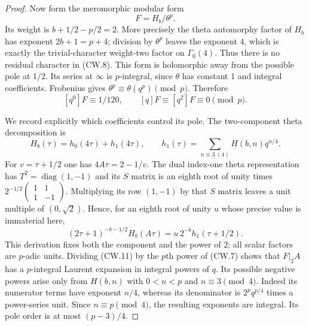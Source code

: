\documentclass[11pt,a4paper]{article}
\theoremstyle{definition}
\begin{document}
\begin{proof}
Now form the meromorphic modular form
\[
                       F=H_b/\theta^p.
 \tag{CW.8}
\]
Its weight is $b+1/2-p/2=2$.  More precisely the theta
automorphy factor of $H_b$ has exponent $2b+1=p+4$;
division by $\theta^p$ leaves the exponent $4$, which is
exactly the trivial-character weight-two factor on $\Gamma_0(4)$.
Thus there is no residual character in (CW.8).
This form is holomorphic away from the possible pole at $1/2$.
Its series at $\infty$ is $p$-integral, since $\theta$ has
constant $1$ and integral coefficients.  Frobenius gives
$\theta^p\equiv\theta(q^p)\pmod p$.  Therefore
\[
 [q^0]F\equiv1/120,
 \qquad [q]F\equiv[q^2]F\equiv0\pmod p.
 \tag{CW.9}
\]

We record explicitly which coefficients control its pole.
The two-component theta decomposition is
\[
 H_b(\tau)=h_0(4\tau)+h_1(4\tau),\qquad
 h_1(\tau)=\sum_{n\equiv3\ (4)}H(b,n)q^{n/4}.
 \tag{CW.10}
\]
For $v=\tau+1/2$ one has $4A\tau=2-1/v$.
The dual index-one theta representation has
$T^2=\operatorname{diag}(1,-1)$ and its $S$ matrix is an
eighth root of unity times
$2^{-1/2}\left(\begin{smallmatrix}1&1\\1&-1\end{smallmatrix}\right)$.
Multiplying its row $(1,-1)$ by that $S$ matrix leaves a
unit multiple of $(0,\sqrt2)$.  Hence, for an eighth root
of unity $u$ whose precise value is immaterial here,
\[
 (2\tau+1)^{-b-1/2}H_b(A\tau)
               =u\,2^{-b}h_1(\tau+1/2).
 \tag{CW.11}
\]
This derivation fixes both the component and the power of $2$;
all scalar factors are $p$-adic units.
Dividing (CW.11) by the $p$th power of (CW.7) shows that
$F|_2A$ has a $p$-integral Laurent expansion in integral
powers of $q$.  Its possible negative powers arise only
from $H(b,n)$ with $0<n<p$ and $n\equiv3\pmod4$.
Indeed its numerator terms have exponent $n/4$, whereas
its denominator is $2^p q^{p/4}$ times a power-series unit.
Since $n\equiv p\pmod4$, the resulting exponents are integral.
Its pole order is at most $(p-3)/4$.


\end{proof}
\end{document}
